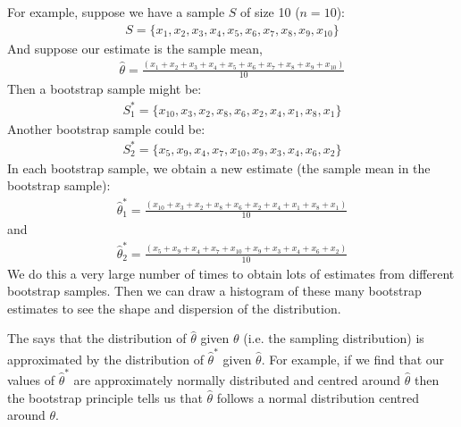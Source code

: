 \documentclass[letterpaper,10pt,english]{jupyterBook}
\begin{document}
\sphinxAtStartPar
For example, suppose we have a sample \(S\) of size 10 (\(n=10\)):
\begin{equation*}
\begin{split}
S = \{ x_1, x_2, x_3, x_4, x_5, x_6, x_7, x_8, x_9, x_{10} \}
\end{split}
\end{equation*}
\sphinxAtStartPar
And suppose our estimate is the sample mean,
\begin{equation*}
\begin{split}
\hat{\theta} = \frac{(x_1 + x_2 +  x_3 +  x_4 +  x_5 + x_6 + x_7 + x_8 + x_9 + x_{10})}{10}
\end{split}
\end{equation*}
\sphinxAtStartPar
Then a bootstrap sample might be:
\begin{equation*}
\begin{split}
S^*_1 = \{x_{10}, x_3, x_2, x_8, x_6, x_2, x_4, x_1, x_8, x_1 \}
\end{split}
\end{equation*}
\sphinxAtStartPar
Another bootstrap sample could be:
\begin{equation*}
\begin{split}
S^*_2 = \{ x_5, x_9, x_4, x_7, x_{10}, x_9, x_3, x_4, x_6, x_2 \}
\end{split}
\end{equation*}
\sphinxAtStartPar
In each bootstrap sample, we obtain a new estimate (the sample mean in the bootstrap sample):
\begin{equation*}
\begin{split}
\hat{\theta}^*_1 = \frac{(x_{10} + x_3 + x_2 + x_8 + x_6 + x_2 + x_4 + x_1 + x_8 + x_1)}{10}
\end{split}
\end{equation*}
\sphinxAtStartPar
and
\begin{equation*}
\begin{split}
\hat{\theta}^*_2 = \frac{(x_5 + x_9 + x_4 + x_7 + x_{10} + x_9 + x_3 + x_4 + x_6 + x_2)}{10}
\end{split}
\end{equation*}
\sphinxAtStartPar
We do this a very large number of times to obtain lots of estimates from different bootstrap samples. Then we can draw a histogram of these many bootstrap estimates to see the shape and dispersion of the distribution.

\sphinxAtStartPar
The  says that the distribution of \(\hat{\theta}\) given \(\theta\) (i.e. the sampling distribution) is approximated by the distribution of \(\hat{\theta}^*\) given \(\hat{\theta}\).  For example, if we find that our values of \(\hat{\theta}^*\) are approximately normally distributed and centred around \(\hat{\theta}\) then the bootstrap principle tells us that \(\hat{\theta}\) follows a normal distribution centred around \(\theta\).
\end{document}

